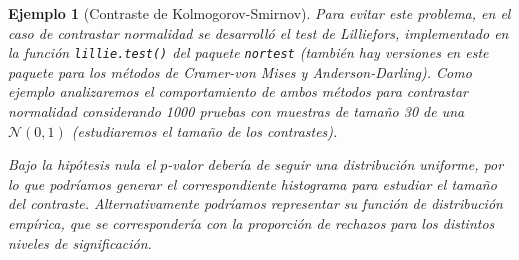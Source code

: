 \documentclass[
  10pt,
]{book}
\newenvironment{Shaded}{\begin{snugshade}}{\end{snugshade}}
\newcommand{\CommentTok}[1]{\textcolor[rgb]{0.56,0.35,0.01}{\textit{#1}}}
\newcommand{\ControlFlowTok}[1]{\textcolor[rgb]{0.13,0.29,0.53}{\textbf{#1}}}
\newcommand{\DecValTok}[1]{\textcolor[rgb]{0.00,0.00,0.81}{#1}}
\newcommand{\FunctionTok}[1]{\textcolor[rgb]{0.00,0.00,0.00}{#1}}
\newcommand{\NormalTok}[1]{#1}
\newcommand{\OtherTok}[1]{\textcolor[rgb]{0.56,0.35,0.01}{#1}}
\newcommand{\SpecialCharTok}[1]{\textcolor[rgb]{0.00,0.00,0.00}{#1}}
\newcommand{\StringTok}[1]{\textcolor[rgb]{0.31,0.60,0.02}{#1}}
\theoremstyle{break}
\newtheorem{example}{Ejemplo}[chapter]
\theoremstyle{nonumberplain}
\renewcommand{\CommentTok}[1]{\textcolor[rgb]{0.41,0.41,0.41}{\texttt{#1}}}
\begin{document}
\begin{example}[Contraste de Kolmogorov-Smirnov]
Para evitar este problema, en el caso de contrastar normalidad se desarrolló el test
de Lilliefors, implementado en la función \texttt{lillie.test()} del paquete \texttt{nortest}
(también hay versiones en este paquete para los métodos de Cramer-von Mises y
Anderson-Darling). Como ejemplo analizaremos el comportamiento de ambos métodos
para contrastar normalidad considerando 1000 pruebas con muestras de tamaño 30 de
una \(\mathcal{N}(0,1)\) (estudiaremos el \emph{tamaño de los contrastes}).

\begin{Shaded}
\end{Shaded}

Bajo la hipótesis nula el \(p\)-valor debería de seguir una distribución uniforme,
por lo que podríamos generar el correspondiente histograma para estudiar el
tamaño del contraste. Alternativamente podríamos representar su función de
distribución empírica, que se correspondería con la proporción de rechazos
para los distintos niveles de significación.


\end{example}
\end{document}
